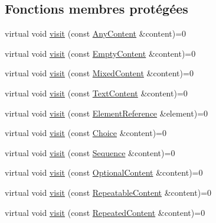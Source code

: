 \subsection*{Fonctions membres protégées}
\begin{DoxyCompactItemize}
\item 
virtual void \hyperlink{classdtd_1_1_interface_d_t_d_visitor_ac2d1f472564e590bbe66f14ab096167a}{visit} (const \hyperlink{classdtd_1_1_any_content}{AnyContent} \&content)=0
\item 
virtual void \hyperlink{classdtd_1_1_interface_d_t_d_visitor_abdf03eb698f07aa0caaa405711fc8aac}{visit} (const \hyperlink{classdtd_1_1_empty_content}{EmptyContent} \&content)=0
\item 
virtual void \hyperlink{classdtd_1_1_interface_d_t_d_visitor_a06be244faf5995ac7ca502b326db10e0}{visit} (const \hyperlink{classdtd_1_1_mixed_content}{MixedContent} \&content)=0
\item 
virtual void \hyperlink{classdtd_1_1_interface_d_t_d_visitor_abd31e761d6d8ab80ac6f3f0a9a20b953}{visit} (const \hyperlink{classdtd_1_1_text_content}{TextContent} \&content)=0
\item 
virtual void \hyperlink{classdtd_1_1_interface_d_t_d_visitor_aaac54822c9519b08305a64aab110716b}{visit} (const \hyperlink{classdtd_1_1_element_reference}{ElementReference} \&element)=0
\item 
virtual void \hyperlink{classdtd_1_1_interface_d_t_d_visitor_a4323aeef86fa385a44fd4572ccc36cd2}{visit} (const \hyperlink{classdtd_1_1_choice}{Choice} \&content)=0
\item 
virtual void \hyperlink{classdtd_1_1_interface_d_t_d_visitor_aa093199d020b5887fbaa8af1573afc51}{visit} (const \hyperlink{classdtd_1_1_sequence}{Sequence} \&content)=0
\item 
virtual void \hyperlink{classdtd_1_1_interface_d_t_d_visitor_a444ada6db2f531579579de7b8fd5fd53}{visit} (const \hyperlink{classdtd_1_1_optional_content}{OptionalContent} \&content)=0
\item 
virtual void \hyperlink{classdtd_1_1_interface_d_t_d_visitor_a76bd6fb0307eea7fc6ef703cf09a07b9}{visit} (const \hyperlink{classdtd_1_1_repeatable_content}{RepeatableContent} \&content)=0
\item 
virtual void \hyperlink{classdtd_1_1_interface_d_t_d_visitor_a8a2ce739049697fcc2a7126adea4536a}{visit} (const \hyperlink{classdtd_1_1_repeated_content}{RepeatedContent} \&content)=0
\end{DoxyCompactItemize}
